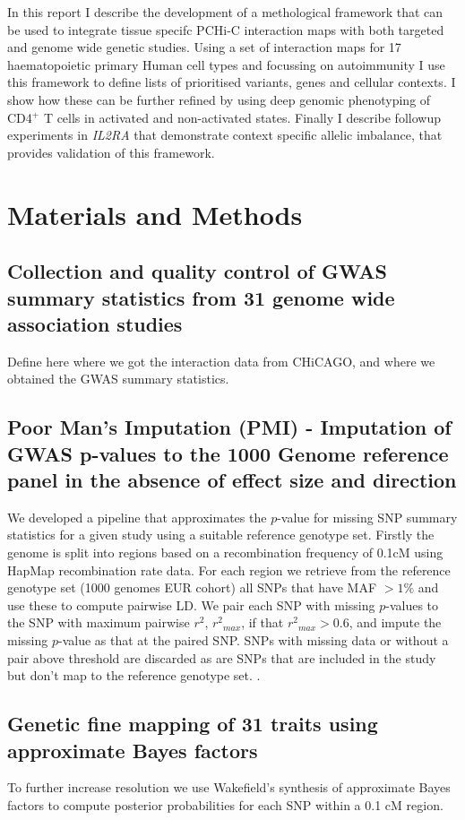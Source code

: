 \documentclass[a4paper,11pt]{book}
\begin{document}
In this report I describe the development of a methological framework that can be used to integrate tissue specifc PCHi-C interaction maps with both targeted and genome wide genetic studies. Using a set of interaction maps for 17 haematopoietic primary Human cell types and focussing on autoimmunity I use this framework to define lists of prioritised variants, genes and cellular contexts. I show how these can be further refined by using  deep genomic phenotyping of  CD4$^{+}$ T cells  in activated and non-activated states. Finally I describe followup experiments in \textit{IL2RA} that demonstrate context specific allelic imbalance, that provides validation of this framework.

\chapter{Materials and Methods}
\section{Collection and quality control of GWAS summary statistics from 31 genome wide association studies}
Define here where we got the interaction data from CHiCAGO, and where we obtained the GWAS summary statistics.
\section{Poor Man's Imputation (PMI) - Imputation of GWAS p-values to the 1000 Genome reference panel in the absence of effect size and direction}
We developed a pipeline that approximates the $p$-value for missing SNP summary statistics for a given study using a suitable reference genotype set. Firstly the genome is split into regions based on a recombination frequency of 0.1cM using HapMap recombination rate data. For each region we retrieve from the reference genotype set (1000 genomes EUR cohort) all SNPs that have MAF $ > 1\%$ and use these to compute pairwise LD. We pair each SNP with missing $p$-values to the SNP with maximum pairwise $r^2$, ${r^2}_{max}$, if that ${r^2}_{max} > 0.6$, and impute the missing $p$-value as that at the paired SNP. SNPs with missing data or without a pair above threshold are discarded as are SNPs that are included in the study but don’t map to the reference genotype set. . 
\section{Genetic fine mapping of 31 traits using approximate Bayes factors}
To further increase resolution we use Wakefield’s synthesis of approximate Bayes factors\cite{Wakefield2009b}  to compute posterior probabilities for each SNP\cite{MallerMcVeanEtAl2012} within a 0.1 cM region.
\end{document}
